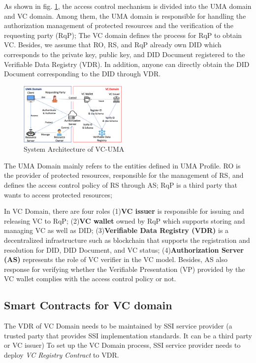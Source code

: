 \documentclass[conference, dvipdfmx]{IEEEtran} %
\begin{document}
\begin{sloppypar}
As shown in fig. \ref{fig:system_architecture}, the access control mechanism is divided into the UMA domain and VC domain. Among them, the UMA domain is responsible for handling the authorization management of protected resources and the verification of the requesting party (RqP);
The VC domain defines the process for RqP to obtain VC. Besides, we assume that RO, RS, and RqP already own DID which corresponds to the private key, public key, and DID Document registered to the Verifiable Data Registry (VDR). In addition, anyone can directly obtain the DID Document corresponding to the DID through VDR.


\begin{figure}[htbp] %
  \begin{center} %
  \includegraphics[width=0.47\textwidth]{images/structure_vc_uma.png} %
  \caption{System Architecture of VC-UMA} %
  \label{fig:system_architecture} %
  \end{center}
\end{figure}

The UMA Domain mainly refers to the entities defined in UMA Profile\cite{UMA}.
RO is the provider of protected resources, responsible for the management of RS, and defines the access control policy of RS through AS;
RqP is a third party that wants to access protected resources; 

In VC Domain, there are four roles (1)\textbf{VC issuer} is responsible for issuing and releasing VC to RqP; (2)\textbf{VC wallet} owned by RqP which supports storing and managing VC as well as DID; (3)\textbf{Verifiable Data Registry (VDR)} is a decentralized infrastructure such as blockchain that supports the registration and resolution for DID, DID Document, and VC status; (4)\textbf{Authorization Server (AS)}  represents the role of VC verifier in the VC model. Besides, AS also response for verifying whether the Verifiable Presentation (VP) provided by the VC wallet complies with the access control policy or not.

\subsection{Smart Contracts for VC domain}
The VDR of VC Domain needs to be maintained by SSI service provider (a trusted party that provides SSI implementation standards. It can be a third party or VC issuer) To set up the VC Domain process, SSI service provider needs to deploy \textit{VC Registry Contract} to VDR.


\end{sloppypar}
\end{document}
